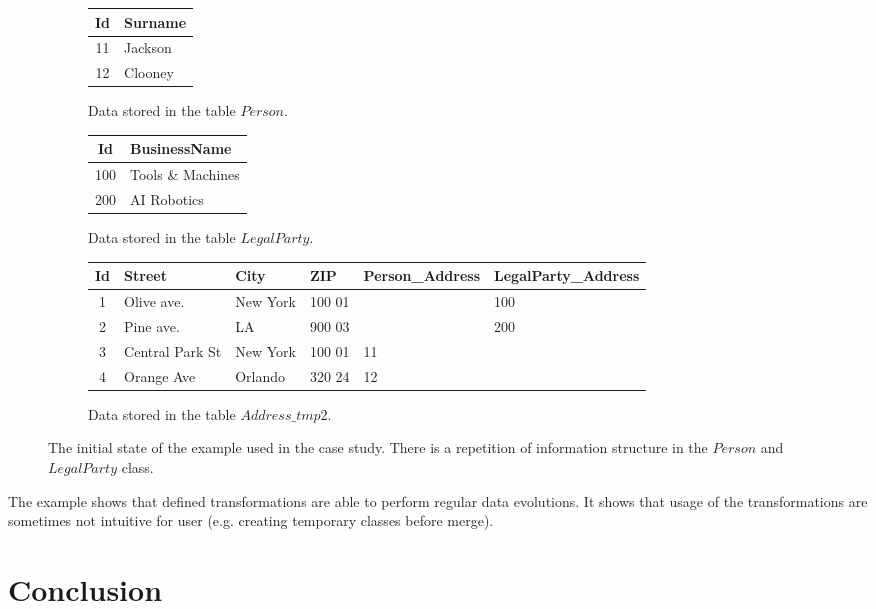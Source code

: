 \documentclass[11pt]{article}
\begin{document}
\begin{figure}
\begin{subfigure}[b]{0.5\textwidth}
	\centering
	\begin{tabular}{| c | l |}
	 	\hline
		Id &  Surname \\ \hline  
		11 & Jackson  \\ \hline
		12 & Clooney  \\ \hline
	\end{tabular}
	\caption{Data stored in the table $Person$.}
\end{subfigure}
\begin{subfigure}[b]{0.5\textwidth}
	\centering
	\begin{tabular}{| c | l |}
	 	\hline
		Id &  BusinessName  \\ \hline  
		100 & Tools \& Machines  \\ \hline
		200 & AI Robotics \\ \hline
	\end{tabular}
	\caption{Data stored in the table $LegalParty$.}
\end{subfigure}
\begin{subfigure}[b]{\textwidth}
	\centering
	\begin{tabular}{| c | l | l | l | l | l |}
	 	\hline
		Id & Street & City & ZIP & Person\_Address & LegalParty\_Address\\ \hline  
		1 & Olive ave. & New York & 100 01 & & 100 \\ \hline
		2 & Pine ave. & LA & 900 03 & & 200  \\ \hline
		3 & Central Park St & New York & 100 01 & 11 &  \\ \hline
		4 & Orange Ave & Orlando & 320 24 & 12 &\\ \hline
	\end{tabular}
	\caption{Data stored in the table $Address\_tmp2$.}
\end{subfigure}
	\caption{The initial state of the example used in the case study. There is a repetition of information structure in the $Person$ and $LegalParty$ class.}
	\label{fig:case2}
\end{figure}

The example shows that defined transformations are able to perform regular data evolutions. It shows that usage of the transformations are sometimes not intuitive for user (e.g. creating temporary classes before merge).


\section{Conclusion}
\end{document}
